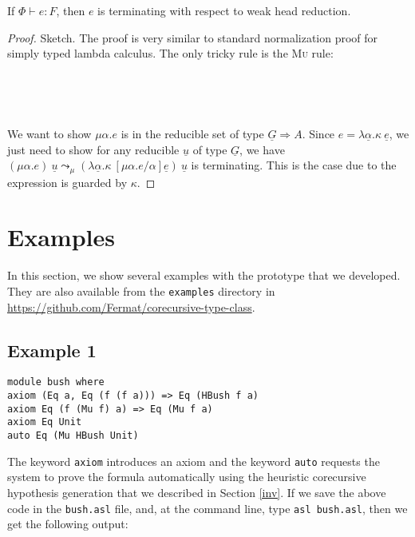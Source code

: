 \documentclass{llncs}
\begin{document}
\begin{theorem}
  If $\Phi \vdash e : F$, then $e$ is terminating with respect to weak head reduction. 
\end{theorem}
\begin{proof} Sketch. The proof is very similar to standard normalization proof for simply typed
lambda calculus. The only tricky rule is the \textsc{Mu} rule: 

\


\

\noindent We want to show $\mu \alpha. e$ is in the reducible set of type $\underline{G} \Rightarrow A$. Since $e = \lambda \underline{\alpha}. \kappa\ \underline{e}$, we just need to show for any reducible $\underline{u}$ of type $\underline{G}$, we have $(\mu \alpha. e) \ \underline{u}\leadsto_\mu (\lambda \underline{\alpha}. \kappa\ [\mu \alpha. e/\alpha]\underline{e})\ \underline{u}$ is terminating. This is the case due to the expression is
guarded by $\kappa$. 
\end{proof}

\section{Examples}
\label{examples}

In this section, we show several examples with the prototype that we developed. They are
also available from the \texttt{examples} directory in \url{https://github.com/Fermat/corecursive-type-class}.

\subsection{Example 1}
\begin{verbatim}
module bush where
axiom (Eq a, Eq (f (f a))) => Eq (HBush f a)
axiom Eq (f (Mu f) a) => Eq (Mu f a)
axiom Eq Unit
auto Eq (Mu HBush Unit)
\end{verbatim}

The keyword \texttt{axiom} introduces an axiom and the keyword \texttt{auto}
requests the system to prove the formula automatically using the heuristic
corecursive hypothesis generation that we described in Section \ref{inv}. If we
save the above code in the \texttt{bush.asl} file, and, at the command line, type
\texttt{asl bush.asl}, then we get the following output:
\end{document}
